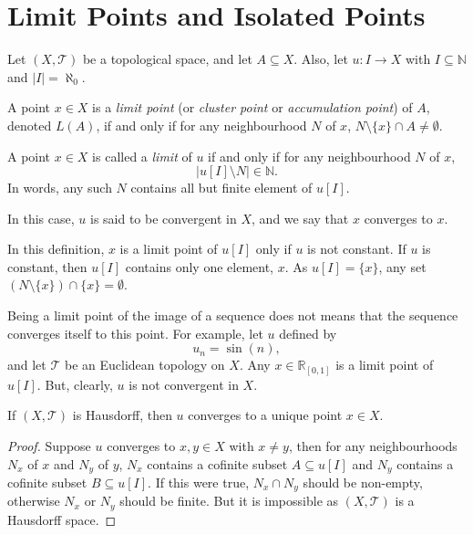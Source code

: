 \section{Limit Points and Isolated Points}


Let $(X, \mathcal T)$ be a topological space, and let $A \subseteq X$. Also, let $u: I \to X$ with $I \subseteq \mathbb N$ and $|I| = \aleph_0$.


\begin{definition}
	A point $x \in X$ is a \textit{limit point} (or \textit{cluster point} or \textit{accumulation point}) of $A$, denoted $L(A)$, if and only if for any neighbourhood $N$ of $x$, $N \setminus \{x\} \cap A \ne \emptyset$.
\end{definition}

\begin{definition}
	A point $x \in X$ is called a \textit{limit} of $u$ if and only if for any neighbourhood $N$ of $x$,
	$$
	|u[I] \setminus N| \in \mathbb N.
	$$
	In words, any such $N$ contains all but finite element of $u[I]$.
	
	In this case, $u$ is said to be convergent in $X$, and we say that $x$ converges to $x$.
\end{definition}


\begin{note}
	In this definition, $x$ is a limit point of $u[I]$ only if $u$ is not constant. If $u$ is constant, then $u[I]$ contains only one element, $x$. As $u[I] = \{x\}$, any set $(N \setminus \{x\}) \cap \{x\} = \emptyset$.
\end{note}


\begin{note}
	Being a limit point of the image of a sequence does not means that the sequence converges itself to this point. For example, let $u$ defined by
	$$
	u_n = \sin(n),
	$$
	and let $\mathcal T$ be an Euclidean topology on $X$. Any $x \in \mathbb R_{[0,1]}$ is a limit point of $u[I]$. But, clearly, $u$ is not convergent in $X$.
\end{note}


\begin{proposition}
	If $(X, \mathcal T)$ is Hausdorff, then $u$ converges to a unique point $x \in X$.
	
	\begin{proof}
		Suppose $u$ converges to $x,y \in X$ with $x \ne y$, then for any neighbourhoods $N_x$ of $x$ and $N_y$ of $y$, $N_x$ contains a cofinite subset $A \subseteq u[I]$ and $N_y$ contains a cofinite subset $B \subseteq u[I]$. If this were true, $N_x \cap N_y$ should be non-empty, otherwise $N_x$ or $N_y$ should be finite. But it is impossible as $(X, \mathcal T)$ is a Hausdorff space.
	\end{proof}
\end{proposition}


